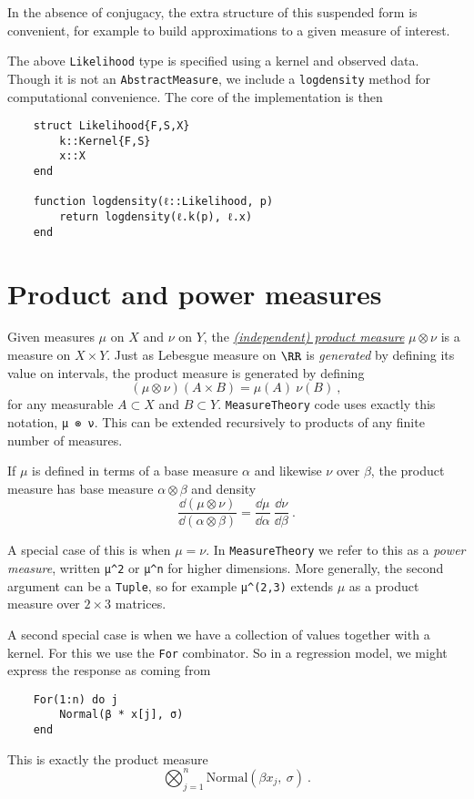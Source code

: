 \documentclass{juliacon}
\begin{document}
In the absence of conjugacy, the extra structure of this suspended form is convenient, for example to build approximations to a given measure of interest.

The above \verb|Likelihood| type is specified using a kernel and observed data. Though it is not an \verb|AbstractMeasure|, we include a \verb|logdensity| method for computational convenience. The core of the implementation is then
\begin{verbatim}
    struct Likelihood{F,S,X}
        k::Kernel{F,S}
        x::X
    end

    function logdensity(ℓ::Likelihood, p) 
        return logdensity(ℓ.k(p), ℓ.x)
    end
\end{verbatim}

\section{Product and power measures}

Given measures $\mu$ on $X$ and $\nu$ on $Y$, the \href{https://en.wikipedia.org/wiki/Product_measure}{\emph{(independent) product measure}} $\mu \otimes \nu$ is a measure on $X\times Y$. Just as Lebesgue measure on $\RR$ is \emph{generated} by defining its value on intervals, the product measure is generated by defining
\[
(\mu \otimes \nu)(A\times B) = \mu(A)\ \nu(B)\ ,
\]
for any measurable $A\subset X$ and $B\subset Y$. \verb|MeasureTheory| code uses exactly this notation, \verb|μ ⊗ ν|. This can be extended recursively to products of any finite number of measures.

If $\mu$ is defined in terms of a base measure $\alpha$ and likewise $\nu$ over $\beta$, the product measure has base measure $\alpha \otimes \beta$ and density
\[
\frac{\dd(\mu \otimes \nu)}{\dd(\alpha \otimes \beta)} = \frac{\dd\mu}{\dd\alpha}\ \frac{\dd\nu}{\dd\beta}\ .
\]



A special case of this is when $\mu = \nu$. In \verb|MeasureTheory| we refer to this as a \emph{power measure}, written \verb|μ^2| or \verb|μ^n| for higher dimensions. More generally, the second argument can be a \verb|Tuple|, so for example \verb|μ^(2,3)| extends $\mu$ as a product measure over $2\times 3$ matrices.

A second special case is when we have a collection of values together with a kernel. For this we use the \verb|For| combinator. So in a regression model, we might express the response as coming from
\begin{verbatim}
    For(1:n) do j  
        Normal(β * x[j], σ)
    end
\end{verbatim}
This is exactly the product measure
\[
\bigotimes_{j=1}^n \text{Normal}(\beta x_j,\ \sigma)\ .
\]
\end{document}
